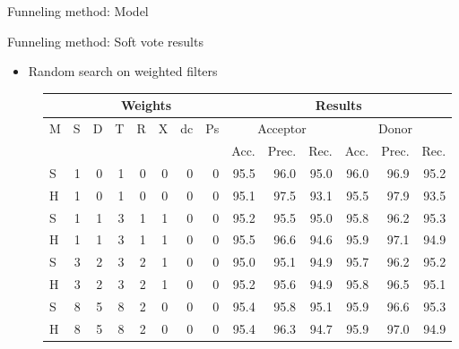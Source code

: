 \documentclass[10pt]{beamer}
\begin{document}
\begin{frame}{Funneling method: Model}
\begin{figure}[ht]
	\end{figure}
\end{frame}

\begin{frame}{Funneling method: Soft vote results}
	\begin{itemize}
		\item Random search on weighted filters
	\end{itemize}
	\begin{figure}
		\scriptsize
		\centering
		\begingroup
		\def\arraystretch{1.1}
		\begin{tabular}{|l|r|r|r|r|r|r|r|r|r|r|r|r|r|}
			\hline
			& \multicolumn{7}{|c|}{Weights} & \multicolumn{6}{c|}{Results}\\
			\hline
			M & S & D & T & R & X & dc & Ps& \multicolumn{3}{c|}{Acceptor} & \multicolumn{3}{c|}{Donor} \\
			\cline{9-14}
			&&&&&&& & Acc. & Prec. & Rec. & Acc. & Prec. & Rec. \\
			\hline
			S &1&0&1&0&0&0&0 & 95.5 & 96.0 & 95.0 & 96.0 & 96.9 & 95.2 \\
			H &1&0&1&0&0&0&0 & 95.1 & 97.5 & 93.1 & 95.5 & 97.9 & 93.5 \\
			S &1&1&3&1&1&0&0 & 95.2 & 95.5 & 95.0 & 95.8 & 96.2 & 95.3 \\
			H &1&1&3&1&1&0&0 & 95.5 & 96.6 & 94.6 & 95.9 & 97.1 & 94.9 \\
			
			S &3&2&3&2&1&0&0 & 95.0 & 95.1 & 94.9 & 95.7 & 96.2 & 95.2 \\
			H &3&2&3&2&1&0&0 & 95.2 & 95.6 & 94.9 & 95.8 & 96.5 & 95.1 \\
			S &8&5&8&2&0&0&0 & 95.4 & 95.8 & 95.1 & 95.9 & 96.6 & 95.3 \\
			H &8&5&8&2&0&0&0 & 95.4 & 96.3 & 94.7 & 95.9 & 97.0 & 94.9 \\
			 
			\hline 
		\end{tabular}
		\endgroup
	\end{figure}
\end{frame}
\end{document}
